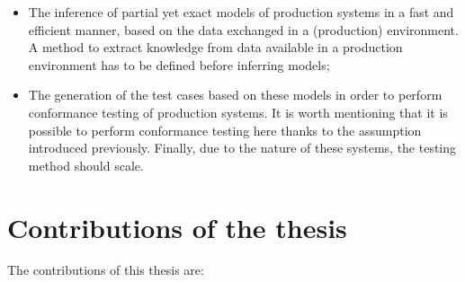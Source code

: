 \begin{itemize}
    \item The inference of partial yet exact models of production
        systems in a fast and efficient manner, based on the data
        exchanged in a (production) environment. A method to
        extract knowledge from data available in a production
        environment has to be defined before inferring models;

    \item The generation of the test cases based on these models
        in order to perform conformance testing of production
        systems. It is worth mentioning that it is possible to
        perform conformance testing here thanks to the assumption
        introduced previously. Finally, due to the nature of
        these systems, the testing method should scale.
\end{itemize}


\section{Contributions of the thesis}
\label{sec:intro:contrib}

The contributions of this thesis are:


